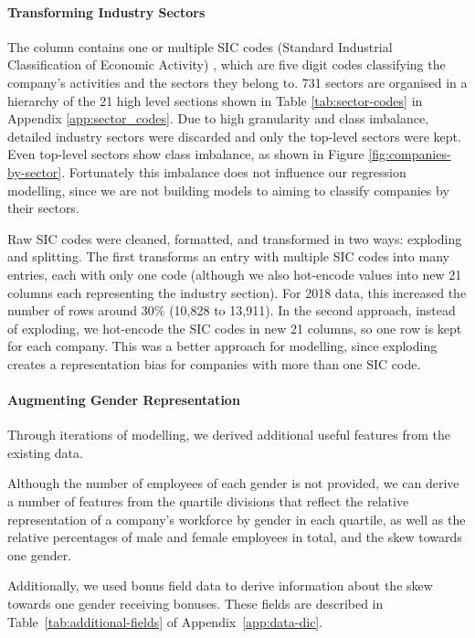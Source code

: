 \paragraph{Transforming Industry Sectors}
\label{sic-agment}
The  column contains one or multiple SIC codes (Standard Industrial Classification of Economic Activity) \cite{sic-codes-2007}, which are five digit codes classifying the company's activities and the sectors they belong to. 731 sectors are organised in a hierarchy of the 21 high level sections shown in Table \ref{tab:sector-codes} in Appendix \ref{app:sector_codes}. Due to high granularity and class imbalance, detailed industry sectors were discarded and only the top-level sectors were kept. Even top-level sectors show class imbalance, as shown in Figure \ref{fig:companies-by-sector}. Fortunately this imbalance does not influence our regression modelling, since we are not building models to aiming to classify companies by their sectors. 

Raw SIC codes were cleaned, formatted, and transformed in two ways: exploding and splitting. The first transforms an entry with multiple SIC codes into many entries, each with only one code (although we also hot-encode values into new 21 columns each representing the industry section). For 2018 data, this increased the number of rows around 30\% (10,828 to 13,911). In the second approach, instead of exploding, we hot-encode the SIC codes in new 21 columns, so one row is kept for each company. This was a better approach for modelling, since exploding creates a representation bias for companies with more than one SIC code.

\paragraph{Augmenting Gender Representation}
Through iterations of modelling, we derived additional useful features from the existing data.

Although the number of employees of each gender is not provided, we can derive a number of features from the quartile divisions that reflect the relative representation of a company's workforce by gender in each quartile, as well as the relative percentages of male and female employees in total, and the skew towards one gender.

Additionally, we used bonus field data to derive information about the skew towards one gender receiving bonuses.
These fields are described in Table\ \ref{tab:additional-fields} of Appendix\ \ref{app:data-dic}. 



